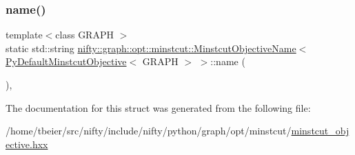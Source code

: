 \subsubsection{\texorpdfstring{name()}{name()}}
{\footnotesize\ttfamily template$<$class G\+R\+A\+PH $>$ \\
static std\+::string \hyperlink{structnifty_1_1graph_1_1opt_1_1minstcut_1_1MinstcutObjectiveName}{nifty\+::graph\+::opt\+::minstcut\+::\+Minstcut\+Objective\+Name}$<$ \hyperlink{namespacenifty_1_1graph_1_1opt_1_1minstcut_a066e5a061f3b821097a733b59298e7fc}{Py\+Default\+Minstcut\+Objective}$<$ G\+R\+A\+PH $>$ $>$\+::name (\begin{DoxyParamCaption}{ }\end{DoxyParamCaption})\hspace{0.3cm}{\ttfamily [inline]}, {\ttfamily [static]}}



The documentation for this struct was generated from the following file\+:\begin{DoxyCompactItemize}
\item 
/home/tbeier/src/nifty/include/nifty/python/graph/opt/minstcut/\hyperlink{python_2graph_2opt_2minstcut_2minstcut__objective_8hxx}{minstcut\+\_\+objective.\+hxx}\end{DoxyCompactItemize}
